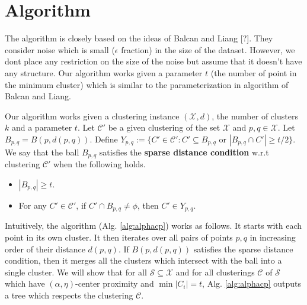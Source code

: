 \documentclass[11pt]{article}
\newcommand{\mc}{\mathcal}
\begin{document}
\section{Algorithm}
The algorithm is closely based on the ideas of Balcan and Liang [?]. They consider noise which is small ($\epsilon$ fraction) in the size of the dataset. However, we dont place any restriction on the size of the noise but assume that it doesn't have any structure. Our algorithm works given a parameter $t$ (the number of point in the minimum cluster) which is similar to the parameterization in algorithm of Balcan and Liang.

Our algorithm works given a clustering instance $(\mc X, d)$, the number of clusters $k$ and a parameter $t$. Let $\mc C'$ be a given clustering of the set $\mc X$ and $p, q \in \mc X$. Let $B_{p,q} = B(p, d(p, q))$. Define $Y_{p,q} := \{C' \in \mc C' : C' \subseteq B_{p,q} \text{ or } |B_{p,q} \cap C'| \ge t/2\}$. 
We say that the ball $B_{p,q}$ satisfies the \textbf{sparse distance condition} w.r.t clustering $\mc C'$ when the following holds.
\begin{itemize}[noitemsep, leftmargin=*]
\item $|B_{p,q}| \ge t$.
\item For any $C' \in \mc C'$, %
if $C' \cap B_{p,q} \neq \phi$, then $C' \in Y_{p,q}$.
\end{itemize}

Intuitively, the algorithm (Alg. \ref{alg:alphacp}) works as follows. It starts with each point in its own cluster. It then iterates over all pairs of points $p, q$ in increasing order of their distance $d(p, q)$. If $B(p, d(p,q))$ satisfies the sparse distance condition, then it merges all the clusters which intersect with the ball into a single cluster. We will show that for all $\mc S \subseteq \mc X$ and for all clusterings $\mc C$ of $\mc S$ which have $(\alpha, \eta)$-center proximity and $\min |C_i| = t$, Alg. \ref{alg:alphacp} outputs a tree which respects the clustering $\mc C$.
\end{document}
